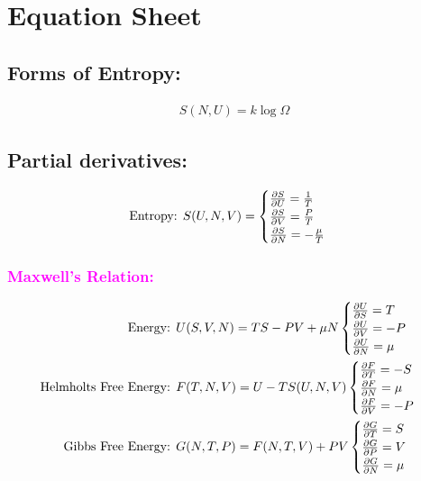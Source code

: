 

\section{Equation Sheet}

\subsection*{Forms of Entropy:}

\begin{align}
    S(N, U) = k \log \Omega 
\end{align}

\subsection*{Partial derivatives:}

\begin{align}
    \text{Entropy: } S(U, N, V) = 
        \begin{cases}
        \pdv{S}{U} = \frac{1}{T} \\
        \pdv{S}{V} = \frac{P}{T} \\
        \pdv{S}{N} = -\frac{\mu}{T} \\
        \end{cases}
\end{align}

\subsubsection*{\textcolor{magenta}{Maxwell's Relation:}}

\begin{align}
    \text{Energy: } & U(S, V, N) = TS - PV + \mu N 
        \begin{cases}
        \pdv{U}{S} = T \\
        \pdv{U}{V} = -P \\
        \pdv{U}{N} = \mu \\
        \end{cases} \\    
    \text{Helmholts Free Energy: } & F(T, N, V) = U - T S(U, N, V) 
        \begin{cases}
        \pdv{F}{T} = -S \\
        \pdv{F}{N} = \mu \\
        \pdv{F}{V} = -P \\
        \end{cases} \\
    \text{Gibbs Free Energy: } & G(N, T, P) = F(N, T, V) + PV 
        \begin{cases}
        \pdv{G}{T} = S \\
        \pdv{G}{P} = V \\
        \pdv{G}{N} = \mu \\
        \end{cases} \\
\end{align}


